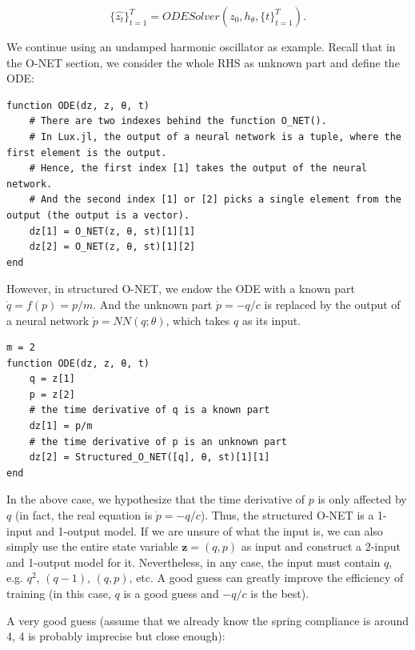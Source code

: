 \documentclass[
	parskip, 			   %
	twoside, 			   %
	DIV=14, 			   %
	BCOR=15.0mm, 		   %
	headsepline, 		   %
	open=right, 		   %
	captions=tableheading, %
	bibliography=totoc,    %
	numbers=noenddot       %
]{scrreprt}
\begin{document}
\begin{equation}
    \label{eq:structured_O-NET_ODESolver}
    \{ \hat{z_{t}} \}_{t=1}^{T} = ODESolver(z_{0}, h_{\theta}, \{ t \}_{t=1}^{T}).
\end{equation}

We continue using an undamped harmonic oscillator as example. Recall that in the O-NET section, we consider the whole RHS as unknown part and define the ODE:

\begin{verbatim}
function ODE(dz, z, θ, t)
    # There are two indexes behind the function O_NET().
    # In Lux.jl, the output of a neural network is a tuple, where the first element is the output.
    # Hence, the first index [1] takes the output of the neural network.
    # And the second index [1] or [2] picks a single element from the output (the output is a vector).
    dz[1] = O_NET(z, θ, st)[1][1]
    dz[2] = O_NET(z, θ, st)[1][2]
end
\end{verbatim}

However, in structured O-NET, we endow the ODE with a known part $\dot{q} = f(p) = p/m$. And the unknown part $\dot{p} = -q/c$ is replaced by the output of a neural network $\dot{p} = NN(q; \theta)$, which takes $q$ as its input.

\begin{verbatim}
m = 2
function ODE(dz, z, θ, t)
    q = z[1]
    p = z[2]
    # the time derivative of q is a known part
    dz[1] = p/m
    # the time derivative of p is an unknown part
    dz[2] = Structured_O_NET([q], θ, st)[1][1]
end
\end{verbatim}

In the above case, we hypothesize that the time derivative of $p$ is only affected by $q$ (in fact, the real equation is $\dot{p} = -q/c$). Thus, the structured O-NET is a 1-input and 1-output model. If we are unsure of what the input is, we can also simply use the entire state variable $\mathbf{z} = (q, p)$ as input and construct a 2-input and 1-output model for it. Nevertheless, in any case, the input must contain $q$, e.g. $q^2$, $(q-1)$, $(q, p)$, etc. A good guess can greatly improve the efficiency of training (in this case, $q$ is a good guess and $-q/c$ is the best). 

A very good guess (assume that we already know the spring compliance is around 4, 4 is probably imprecise but close enough):
\end{document}
